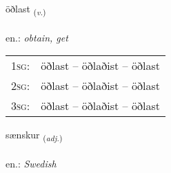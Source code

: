\documentclass[frontgrid, backgrid]{flacards}\usepackage[]{graphicx}\usepackage[]{xcolor}
\begin{document}
\renewcommand{\flhead}{\vskip5pt \fboxsep=0pt {\small\bfseries\footnotesize Sagnorð | Verb}}
\renewcommand{\fcfoot}{\vskip5pt \fboxsep=0pt \hspace{2pt}{\small\bfseries\footnotesize 2K}}

\renewcommand{\blhead}{\vskip5pt {\small\bfseries\footnotesize Sagnorð | Verb }}
\renewcommand{\bcfoot}{\vskip5pt \hspace{2pt}{\small\bfseries\footnotesize 2K}}


{öðlast \small{\textsubscript{(\textit{v.})}} \\[1ex] %
\textphonetic{[œðlast]} \\
en.: \emph{obtain, get} \\  [2ex]
\renewcommand*{\arraystretch}{0.8}
\begin{tabular}{p{1cm}l}
\textsc{1sg}: & öðlast -- öðlaðist -- öðlast \\ 
\textsc{2sg}: & öðlast -- öðlaðist -- öðlast \\ 
\textsc{3sg}: & öðlast -- öðlaðist -- öðlast \\ 
\end{tabular}
}

\renewcommand{\flhead}{\vskip5pt \fboxsep=0pt {\small\bfseries\footnotesize Lýsingarorð | Adjective}}
\renewcommand{\fcfoot}{\vskip5pt \fboxsep=0pt \hspace{2pt}{\small\bfseries\footnotesize 2K}}

\renewcommand{\blhead}{\vskip5pt {\small\bfseries\footnotesize Lýsingarorð | Adjective }}
\renewcommand{\bcfoot}{\vskip5pt \hspace{2pt}{\small\bfseries\footnotesize 2K}}


{sænskur \small{\textsubscript{(\textit{adj.})}} \\[1ex] %
\textphonetic{[sainskʏr]} \\
en.: \emph{Swedish} \\  [2ex]
\renewcommand*{\arraystretch}{0.8}
}
\end{document}
